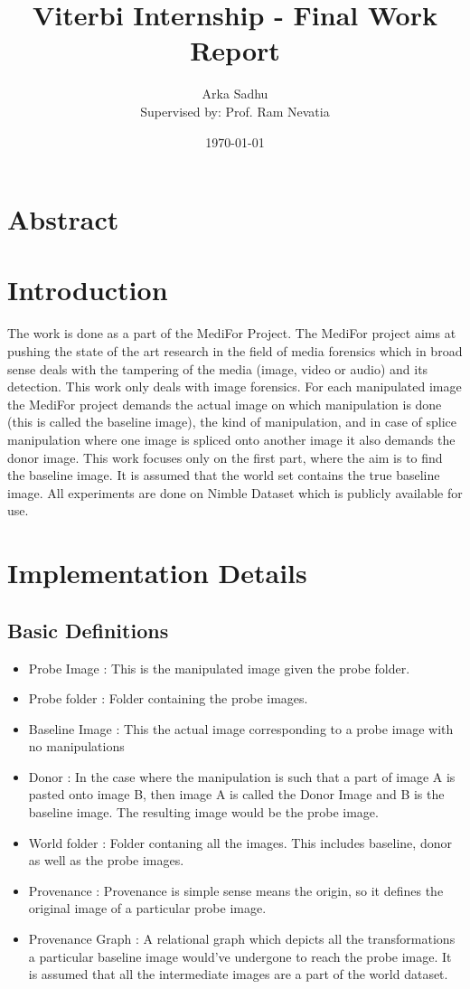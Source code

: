 \documentclass{article}
\title{Viterbi Internship - Final Work Report}
\author{Arka Sadhu\\{ Supervised by: Prof. Ram Nevatia}}
\date{\today}
\begin{document}
\maketitle

\tableofcontents
\newpage

\section{Abstract}

\section{Introduction}
The work is done as a part of the MediFor Project. The MediFor project aims at pushing the state of the art research in the field of media forensics which in broad sense deals with the tampering of the media (image, video or audio) and its detection. This work only deals with image forensics. For each manipulated image the MediFor project demands the actual image on which manipulation is done (this is called the baseline image), the kind of manipulation, and in case of splice manipulation where one image is spliced onto another image it also demands the donor image. This work focuses only on the first part, where the aim is to find the baseline image. It is assumed that the world set contains the true baseline image. All experiments are done on Nimble Dataset which is publicly available for use.
\section{Implementation Details}
\subsection{Basic Definitions}

\begin{itemize}
\item Probe Image : This is the manipulated image given the probe folder.
\item Probe folder : Folder containing the probe images.
\item Baseline Image : This the actual image corresponding to a probe image with no manipulations
\item Donor : In the case where the manipulation is such that a part of image A is pasted onto image B, then image A is called the Donor Image and B is the baseline image. The resulting image would be the probe image.
\item World folder : Folder contaning all the images. This includes baseline, donor as well as the probe images.
\item Provenance : Provenance is simple sense means the origin, so it defines the original image of a particular probe image.
\item Provenance Graph : A relational graph which depicts all the transformations a particular baseline image would've undergone to reach the probe image. It is assumed that all the intermediate images are a part of the world dataset.
\end{itemize}
\end{document}
